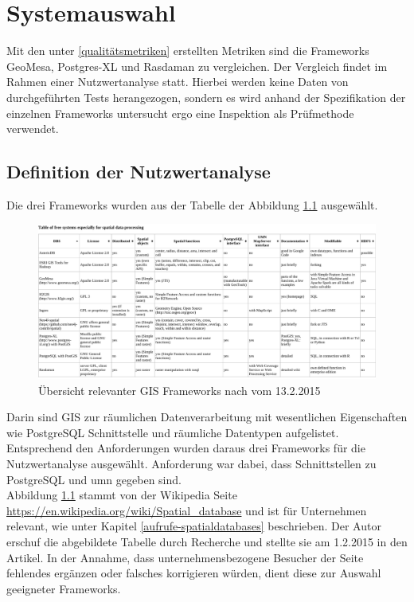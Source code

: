 \chapter{Systemauswahl}
Mit den unter \ref{qualitätsmetriken} erstellten Metriken sind die Frameworks GeoMesa, Postgres-XL und Rasdaman zu vergleichen.
Der Vergleich findet im Rahmen einer Nutzwertanalyse statt.
Hierbei werden keine Daten von durchgeführten Tests herangezogen, sondern es wird anhand der Spezifikation der einzelnen Frameworks untersucht ergo eine Inspektion als Prüfmethode verwendet.

\section{Definition der Nutzwertanalyse}
\label{section:definitionnutzwertanalyse}
Die drei Frameworks wurden aus der Tabelle der Abbildung \ref{fig:spatialdatabases} ausgewählt.
\begin{figure}
\centering
\includegraphics[angle=90,width=.66\textwidth]{Abbildungen/table_spatialdatabases_13_2_15.pdf}
\caption[Übersicht relevanter GIS Frameworks]{Übersicht relevanter GIS Frameworks nach \cite{website:wiki-spatialdatabase} vom 13.2.2015}
\label{fig:spatialdatabases}
\end{figure}
Darin sind GIS zur räumlichen Datenverarbeitung mit wesentlichen Eigenschaften wie \mbox{PostgreSQL} Schnittstelle und räumliche Datentypen aufgelistet.
Entsprechend den Anforderungen wurden daraus drei Frameworks für die Nutzwertanalyse ausgewählt.
Anforderung war dabei, dass Schnittstellen zu PostgreSQL und \Gls{umn} gegeben sind.\\
Abbildung \ref{fig:spatialdatabases} stammt von der Wikipedia Seite \url{https://en.wikipedia.org/wiki/Spatial_database} und ist für Unternehmen relevant, wie unter Kapitel \ref{aufrufe-spatialdatabases} beschrieben.
Der Autor erschuf die abgebildete Tabelle durch Recherche und stellte sie am 1.2.2015 in den Artikel.
In der Annahme, dass unternehmensbezogene Besucher der Seite fehlendes ergänzen oder falsches korrigieren würden, dient diese zur Auswahl geeigneter Frameworks.

